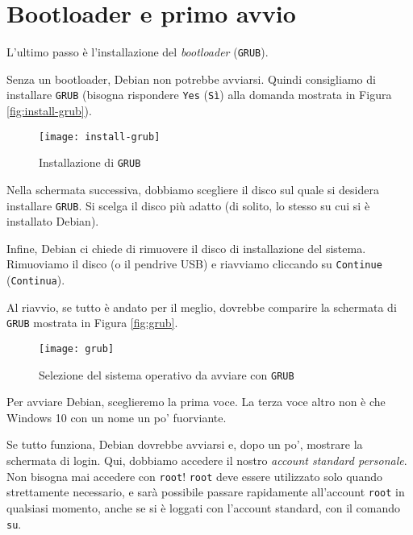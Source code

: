 \section{Bootloader e primo avvio}
L'ultimo passo è l'installazione del \textit{bootloader} (\texttt{GRUB}).

Senza un bootloader, Debian non potrebbe avviarsi. Quindi consigliamo di installare \texttt{GRUB} (bisogna rispondere \texttt{Yes} (\texttt{Sì}) alla domanda mostrata in Figura \vref{fig:install-grub}).

\begin{figure}[ht]
	\centering
	\texttt{[image: install-grub]}
	\caption{Installazione di \texttt{GRUB}}
	\label{fig:install-grub}
\end{figure}

Nella schermata successiva, dobbiamo scegliere il disco sul quale si desidera installare \texttt{GRUB}. Si scelga il disco più adatto (di solito, lo stesso su cui si è installato Debian).

Infine, Debian ci chiede di rimuovere il disco di installazione del sistema. Rimuoviamo il disco (o il pendrive USB) e riavviamo cliccando su \texttt{Continue} (\texttt{Continua}).

Al riavvio, se tutto è andato per il meglio, dovrebbe comparire la schermata di \texttt{GRUB} mostrata in Figura \vref{fig:grub}.

\begin{figure}[ht]
	\centering
	\texttt{[image: grub]}
	\caption{Selezione del sistema operativo da avviare con \texttt{GRUB}}
	\label{fig:grub}
\end{figure}


Per avviare Debian, sceglieremo la prima voce. La terza voce altro non è che Windows 10 con un nome un po' fuorviante.

Se tutto funziona, Debian dovrebbe avviarsi e, dopo un po', mostrare la schermata di login. Qui, dobbiamo accedere il nostro \textit{account standard personale}. Non bisogna mai accedere con \texttt{root}! \texttt{root} deve essere utilizzato solo quando strettamente necessario, e sarà possibile passare rapidamente all'account \texttt{root} in qualsiasi momento, anche se si è loggati con l'account standard, con il comando \texttt{su}.
